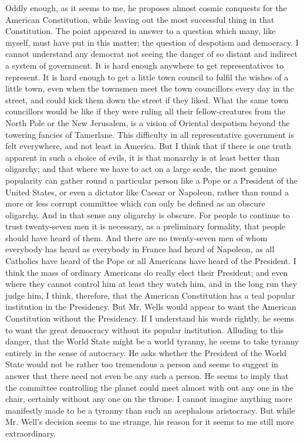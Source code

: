\documentclass{book}
\begin{document}
Oddly enough, as it seems to me, he proposes almost cosmic conquests for the American Constitution, while leaving out the most successful thing in that Constitution. The point appeared in answer to a question which many, like myself, must have put in this matter; the question of despotism and democracy. I cannot understand any democrat not seeing the danger of so distant and indirect a system of government. It is hard enough anywhere to get representatives to represent. It is hard enough to get a little town council to fulfil the wishes of a little town, even when the townsmen meet the town councillors every day in the street, and could kick them down the street if they liked. What the same town councillors would be like if they were ruling all their fellow-creatures from the North Pole or the New Jerusalem, is a vision of Oriental despotism beyond the towering fancies of Tamerlane. This difficulty in all representative government is felt everywhere, and not least in America. But I think that if there is one truth apparent in such a choice of evils, it is that monarchy is at least better than oligarchy; and that where we have to act on a large scale, the most genuine popularity can gather round a particular person like a Pope or a President of the United States, or even a dictator like Caesar or Napoleon, rather than round a more or less corrupt committee which can only be defined as an obscure oligarchy. And in that sense any oligarchy is obscure. For people to continue to trust twenty-seven men it is necessary, as a preliminary formality, that people should have heard of them. And there are no twenty-seven men of whom everybody has heard as everybody in France had heard of Napoleon, as all Catholics have heard of the Pope or all Americans have heard of the President. I think the mass of ordinary Americans do really elect their President; and even where they cannot control him at least they watch him, and in the long run they judge him, I think, therefore, that the American Constitution has a teal popular institution in the Presidency. But Mr. Wells would appear to want the American Constitution without the Presidency. If I understand his words rightly, he seems to want the great democracy without its popular institution. Alluding to this danger, that the World State might be a world tyranny, he seems to take tyranny entirely in the sense of autocracy. He asks whether the President of the World State would not be rather too tremendous a person and seems to suggest in answer that there need not even be any such a person. He seems to imply that the committee controlling the planet could meet almost with out any one in the chair, certainly without any one on the throne. I cannot imagine anything more manifestly made to be a tyranny than such an acephalous aristocracy. But while Mr. Well’s decision seems to me strange, his reason for it seems to me still more extraordinary.
\end{document}
